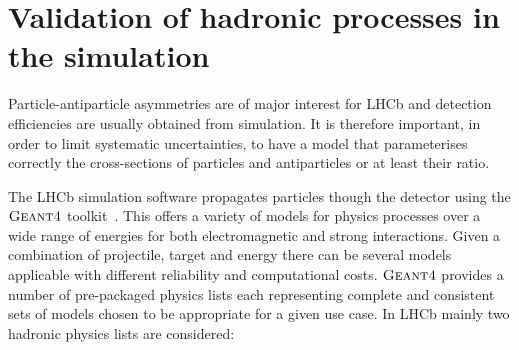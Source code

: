 \section{Validation of hadronic processes in the simulation}
\label{sec:validation}

Particle-antiparticle asymmetries are of major interest for LHCb and detection efficiencies are usually obtained from simulation.
It is therefore important, in order to limit systematic uncertainties, to have a model that parameterises
correctly the cross-sections of particles and antiparticles or at least their ratio.

The LHCb simulation software propagates particles though the detector using the $\textsc{Geant4}$ toolkit~\cite{Alves:2008zz}.
This offers a variety of models for physics processes over a wide range of energies for both electromagnetic and strong interactions.
Given a combination of projectile, target and energy there can be several models applicable with different reliability
and computational costs. $\textsc{Geant4}$ provides a number of pre-packaged physics lists each representing
complete and consistent sets of models chosen to be appropriate for a given use case. In LHCb mainly two hadronic
physics lists are considered:
%
